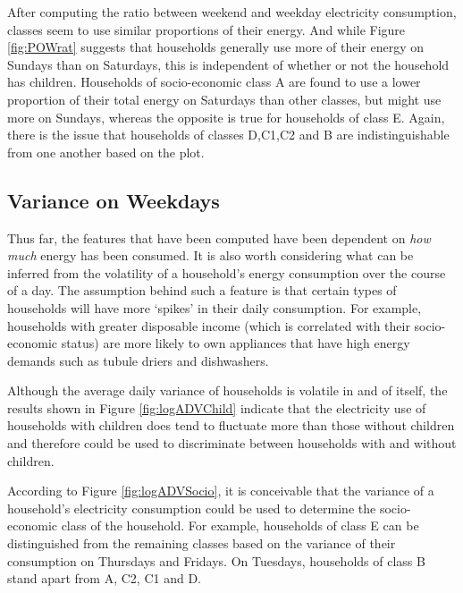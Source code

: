 After computing the ratio between weekend and weekday electricity consumption, classes seem to use similar proportions of their energy. And while Figure \ref{fig:POWrat} suggests that households generally use more of their energy on Sundays than on Saturdays, this is independent of whether or not the household has children. Households of socio-economic class A are found to use a lower proportion of their total energy on Saturdays than other classes, but might use more on Sundays, whereas the opposite is true for households of class E. Again, there is the issue that households of classes D,C1,C2 and B are indistinguishable from one another based on the plot.


\subsection*{Variance on Weekdays}
Thus far, the features that have been computed have been dependent on \textit{how much} energy has been consumed. It is also worth considering what can be inferred from the volatility of a household's energy consumption over the course of a day. The assumption behind such a feature is that certain types of households will have more `spikes' in their daily consumption. For example, households with greater disposable income (which is correlated with their socio-economic status) are more likely to own appliances that have high energy demands such as tubule driers and dishwashers.

\logADVChild %


Although the average daily variance of households is volatile in and of itself, the results shown in Figure \ref{fig:logADVChild} indicate that the electricity use of households with children does tend to fluctuate more than those without children and therefore could be used to discriminate between households with and without children. 

\logADVSocio %

According to Figure \ref{fig:logADVSocio}, it is conceivable that the variance of a household's electricity consumption could be used to determine the socio-economic class of the household. For example, households of class E can be distinguished from the remaining classes based on the variance of their consumption on Thursdays and Fridays. On Tuesdays, households of class B stand apart from A, C2, C1 and D. %


